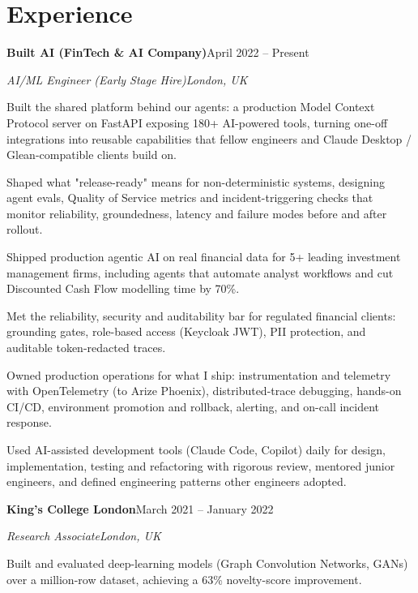 \documentclass[10pt,a4paper]{article}
\newcommand{\entry}[4]{%
  {\color{company}\bfseries #1}\hfill {\color{muted}#2}\par
  \vspace{1pt}
  {\itshape #3}\hfill {\color{muted}\itshape #4}\par
  \vspace{3pt}%
}
\begin{document}
\section{Experience}
\entry{Built AI (FinTech \& AI Company)}{April 2022 -- Present}{AI/ML Engineer (Early Stage Hire)}{London, UK}
\begin{tight}
  \item Built the shared platform behind our agents: a production Model Context Protocol server on FastAPI exposing 180+ AI-powered tools, turning one-off integrations into reusable capabilities that fellow engineers and Claude Desktop / Glean-compatible clients build on.
  \item Shaped what "release-ready" means for non-deterministic systems, designing agent evals, Quality of Service metrics and incident-triggering checks that monitor reliability, groundedness, latency and failure modes before and after rollout.
  \item Shipped production agentic AI on real financial data for 5+ leading investment management firms, including agents that automate analyst workflows and cut Discounted Cash Flow modelling time by 70\%.
  \item Met the reliability, security and auditability bar for regulated financial clients: grounding gates, role-based access (Keycloak JWT), PII protection, and auditable token-redacted traces.
  \item Owned production operations for what I ship: instrumentation and telemetry with OpenTelemetry (to Arize Phoenix), distributed-trace debugging, hands-on CI/CD, environment promotion and rollback, alerting, and on-call incident response.
  \item Used AI-assisted development tools (Claude Code, Copilot) daily for design, implementation, testing and refactoring with rigorous review, mentored junior engineers, and defined engineering patterns other engineers adopted.
\end{tight}

\entry{King's College London}{March 2021 -- January 2022}{Research Associate}{London, UK}
\begin{tight}
  \item Built and evaluated deep-learning models (Graph Convolution Networks, GANs) over a million-row dataset, achieving a 63\% novelty-score improvement.
\end{tight}

\end{document}
